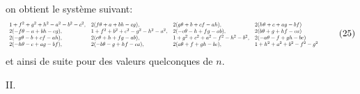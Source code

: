 \documentclass[11pt]{article}
\begin{document}
on obtient le syst\`eme suivant:
\[
\resizebox{\textwidth}{!}{$\displaystyle
\begin{array}{llll}
1 + f^{2} + g^{2} + h^{2} - a^{2} - b^{2} - c^{2}, & 2(f\theta + a + b h - c g), & 2(g\theta + b + c f - a h), & 2(h\theta + c + a g - b f) \\
2(-f\theta - a + b h - c g), & 1 + f^{2} + b^{2} + c^{2} - g^{2} - h^{2} - a^{2}, & 2(-c\theta - h + f g - a b), & 2(b\theta + g + h f - c a) \\
2(-g\theta - b + c f - a h), & 2(c\theta + h + f g - a b), & 1 + g^{2} + c^{2} + a^{2} - f^{2} - h^{2} - b^{2}, & 2(-a\theta - f + g h - b c) \\
2(-h\theta - c + a g - b f), & 2(-b\theta - g + h f - c a), & 2(a\theta + f + g h - b c), & 1 + h^{2} + a^{2} + b^{2} - f^{2} - g^{2}
\end{array}$} \tag{25}
\]
et ainsi de suite pour des valeurs quelconques de $n$.

\medskip
\noindent\textsc{II.}
\end{document}
